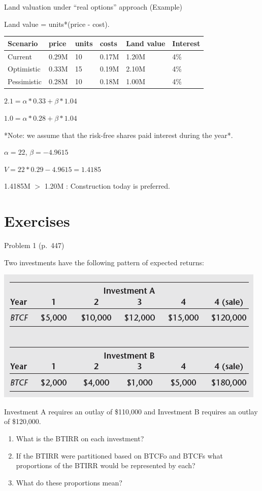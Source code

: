 \documentclass[ignorenonframetext,]{beamer}
\providecommand{\tightlist}{%
\setlength{\itemsep}{0pt}\setlength{\parskip}{0pt}}
\begin{document}
\begin{frame}{Land valuation under ``real options'' approach (Example)}

Land value = units*(price - cost).

\begin{longtable}[]{@{}llllll@{}}
\toprule
Scenario & price & units & costs & Land value & Interest\tabularnewline
\midrule
\endhead
Current & 0.29M & 10 & 0.17M & 1.20M & 4\%\tabularnewline
Optimistic & 0.33M & 15 & 0.19M & 2.10M & 4\%\tabularnewline
Pessimistic & 0.28M & 10 & 0.18M & 1.00M & 4\%\tabularnewline
\bottomrule
\end{longtable}

\(2.1 = \alpha*0.33 + \beta*1.04\)

\(1.0 = \alpha*0.28 + \beta*1.04\)

\footnotesize
*Note: we assume that the risk-free shares paid interest during the
year*. \small

\(\alpha = 22\), \(\beta = -4.9615\)

\(V = 22*0.29 -4.9615 = 1.4185\)

1.4185M \(>\) 1.20M : Construction today is preferred.

\normalsize

\end{frame}

\section{Exercises}\label{exercises}

\begin{frame}{Problem 1 (p.~447)}

Two investments have the following pattern of expected returns:

\begin{center}\includegraphics[width=200 px]{p1_447} \end{center}

Investment A requires an outlay of \$110,000 and Investment B requires
an outlay of \$120,000.

\begin{enumerate}
\def\labelenumi{\arabic{enumi}.}
\tightlist
\item
  What is the BTIRR on each investment?
\item
  If the BTIRR were partitioned based on BTCFo and BTCFs what
  proportions of the BTIRR would be represented by each?
\item
  What do these proportions mean?
\end{enumerate}

\end{frame}
\end{document}
